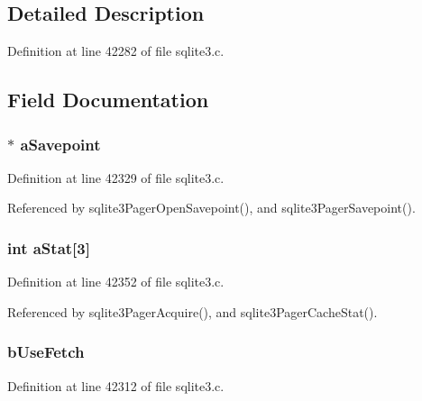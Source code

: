 \subsection{Detailed Description}


Definition at line 42282 of file sqlite3.\+c.



\subsection{Field Documentation}
\hypertarget{struct_pager_af464c94c2f39406e429a894bec61ed08}{}
\subsubsection[{a\+Savepoint}]{$\ast$ a\+Savepoint}\label{struct_pager_af464c94c2f39406e429a894bec61ed08}


Definition at line 42329 of file sqlite3.\+c.



Referenced by sqlite3\+Pager\+Open\+Savepoint(), and sqlite3\+Pager\+Savepoint().

\hypertarget{struct_pager_ad00d3a845ed5e63880bb144b35ccb053}{}
\subsubsection[{a\+Stat}]{\setlength{\rightskip}{0pt plus 5cm}int a\+Stat\mbox{[}3\mbox{]}}\label{struct_pager_ad00d3a845ed5e63880bb144b35ccb053}


Definition at line 42352 of file sqlite3.\+c.



Referenced by sqlite3\+Pager\+Acquire(), and sqlite3\+Pager\+Cache\+Stat().

\hypertarget{struct_pager_a36661c3c1b04f86795a22e0842bece1a}{}
\subsubsection[{b\+Use\+Fetch}]{ b\+Use\+Fetch}\label{struct_pager_a36661c3c1b04f86795a22e0842bece1a}


Definition at line 42312 of file sqlite3.\+c.

